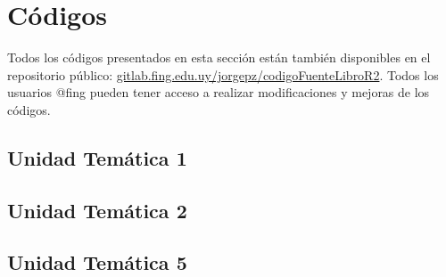 
\chapter{Códigos}

Todos los códigos presentados en esta sección están también disponibles en el repositorio público:
\href{https://gitlab.fing.edu.uy/jorgepz/codigoFuenteLibroR2}{gitlab.fing.edu.uy/jorgepz/codigoFuenteLibroR2}. %
%
Todos los usuarios @fing pueden tener acceso a realizar modificaciones y mejoras de los códigos.


\section{Unidad Temática 1}




\section{Unidad Temática 2}














\section{Unidad Temática 5} \label{sec:codut5}


